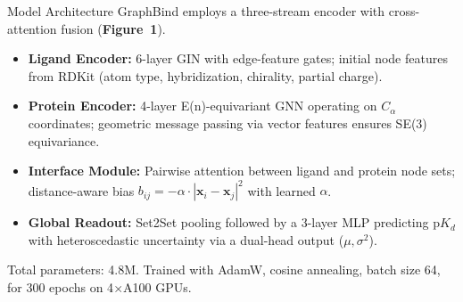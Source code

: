 \documentclass[14pt]{extarticle}
\begin{document}
\begin{minipage}[t]{0.31\textwidth}
\begin{posterblock}{Model Architecture}
GraphBind employs a three-stream encoder with cross-attention fusion (\textbf{Figure~1}).
\begin{itemize}[leftmargin=*, itemsep=6pt, topsep=6pt]
  \item \textbf{Ligand Encoder:} 6-layer GIN with edge-feature gates; initial node features from RDKit
        (atom type, hybridization, chirality, partial charge).
  \item \textbf{Protein Encoder:} 4-layer E(n)-equivariant GNN operating on $C_\alpha$ coordinates;
        geometric message passing via vector features ensures SE(3) equivariance.
  \item \textbf{Interface Module:} Pairwise attention between ligand and protein node sets;
        distance-aware bias $b_{ij} = -\alpha \cdot |\mathbf{x}_i - \mathbf{x}_j|^2$ with learned $\alpha$.
  \item \textbf{Global Readout:} Set2Set pooling followed by a 3-layer MLP predicting $\mathrm{p}K_d$
        with heteroscedastic uncertainty via a dual-head output ($\mu, \sigma^2$).
\end{itemize}
Total parameters: 4.8M. Trained with AdamW, cosine annealing, batch size 64, for 300 epochs on 4$\times$A100 GPUs.
\end{posterblock}

\end{minipage}\hfill
\end{document}
